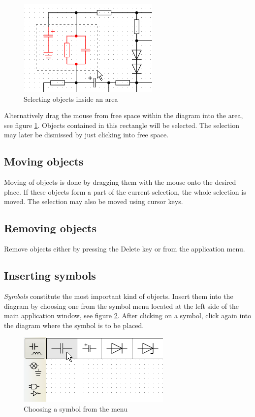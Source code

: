 \documentclass[12pt,oneside,a4paper,titlepage,final]{article}
\theoremstyle{note}
\begin{document}
\begin{figure}[ht]
	\centering
	\includegraphics{select-objects}
	\caption{Selecting objects inside an area}
	\label{select-objects}
\end{figure}

Alternatively drag the mouse from free space within the diagram into the area, see figure \ref{select-objects}. Objects contained in this rectangle will be selected. The selection may later be dismissed by just clicking into free space.

\subsection{Moving objects}
Moving of objects is done by dragging them with the mouse onto the desired place. If these objects form a part of the current selection, the whole selection is moved. The selection may also be moved using cursor keys.

\subsection{Removing objects}
Remove objects either by pressing the Delete key or from the application menu.

\subsection{Inserting symbols}
\emph{Symbols} constitute the most important kind of objects. Insert them into the diagram by choosing one from the symbol menu located at the left side of the main application window, see figure \ref{select-symbol}. After clicking on a symbol, click again into the diagram where the symbol is to be placed.

\begin{figure}[ht]
	\centering
	\includegraphics{select-symbol}
	\caption{Choosing a symbol from the menu}
	\label{select-symbol}
\end{figure}
\end{document}
